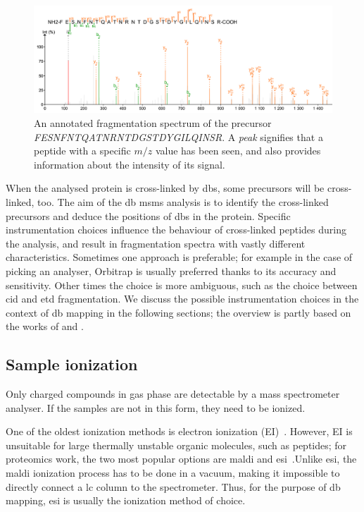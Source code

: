 \begin{figure}
  \centering
  \includegraphics[width=1\linewidth]{img/fragmentation-spectrum.png}
  \caption{An annotated fragmentation spectrum of the precursor \emph{FESNFNTQATNRNTDGSTDYGILQINSR}. A \emph{peak} signifies that a peptide with a specific \(m/z\) value has been seen, and also provides information about the intensity of its signal.}\label{fig:frag-spectrum}
\end{figure}

When the analysed protein is cross-linked by \glspl*{db}, some precursors will be cross-linked, too. The aim of the \gls*{db} \gls*{msms} analysis is to identify the cross-linked precursors and deduce the positions of \glspl*{db} in the protein. Specific instrumentation choices influence the behaviour of cross-linked peptides during the analysis, and result in fragmentation spectra with vastly different characteristics. Sometimes one approach is preferable; for example in the case of picking an analyser, Orbitrap is usually preferred thanks to its accuracy and sensitivity. Other times the choice is more ambiguous, such as the choice between \gls*{cid} and \gls*{etd} fragmentation. We discuss the possible instrumentation choices in the context of \gls*{db} mapping in the following sections; the overview is partly based on the works of \citet{matthiesen2007mass} and \citet{gross2006mass}.

\subsection{Sample ionization}\label{sec:ionization}

Only charged compounds in gas phase are detectable by a mass spectrometer analyser. If the samples are not in this form, they need to be ionized.

One of the oldest ionization methods is electron ionization (EI)~\cite{field2013electron}. However, EI is unsuitable for large thermally unstable organic molecules, such as peptides; for proteomics work, the two most popular options are \gls*{maldi} and \gls*{esi}~\cite{caprioli1997molecular, fenn1990electrospray}.\@ Unlike \gls*{esi}, the \gls*{maldi} ionization process has to be done in a vacuum, making it impossible to directly connect a \gls*{lc} column to the spectrometer. Thus, for the purpose of \gls*{db} mapping, \gls*{esi} is usually the ionization method of choice.

